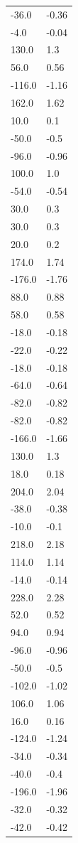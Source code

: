 \begin{longtable}{ll}
-36.0 & -0.36 \\
-4.0 & -0.04 \\
130.0 & 1.3 \\
56.0 & 0.56 \\
-116.0 & -1.16 \\
162.0 & 1.62 \\
10.0 & 0.1 \\
-50.0 & -0.5 \\
-96.0 & -0.96 \\
100.0 & 1.0 \\
-54.0 & -0.54 \\
30.0 & 0.3 \\
30.0 & 0.3 \\
20.0 & 0.2 \\
174.0 & 1.74 \\
-176.0 & -1.76 \\
88.0 & 0.88 \\
58.0 & 0.58 \\
-18.0 & -0.18 \\
-22.0 & -0.22 \\
-18.0 & -0.18 \\
-64.0 & -0.64 \\
-82.0 & -0.82 \\
-82.0 & -0.82 \\
-166.0 & -1.66 \\
130.0 & 1.3 \\
18.0 & 0.18 \\
204.0 & 2.04 \\
-38.0 & -0.38 \\
-10.0 & -0.1 \\
218.0 & 2.18 \\
114.0 & 1.14 \\
-14.0 & -0.14 \\
228.0 & 2.28 \\
52.0 & 0.52 \\
94.0 & 0.94 \\
-96.0 & -0.96 \\
-50.0 & -0.5 \\
-102.0 & -1.02 \\
106.0 & 1.06 \\
16.0 & 0.16 \\
-124.0 & -1.24 \\
-34.0 & -0.34 \\
-40.0 & -0.4 \\
-196.0 & -1.96 \\
-32.0 & -0.32 \\
-42.0 & -0.42 \\

\end{longtable}
